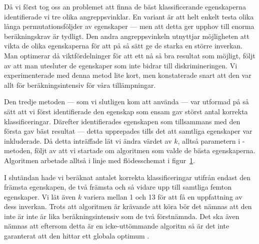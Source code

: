 \documentclass[../rapport_MVEX01-11-05]{subfiles}
\begin{document}
Då vi först tog oss an problemet att finna de bäst klassificerande
egenskaperna identifierade vi tre olika angreppsvinklar. En variant är att helt
enkelt testa olika långa permutationsföljder av egenskaper ---
men att detta ger upphov till enorma beräkningskrav är tydligt. 
Den andra angreppsvinkeln utnyttjar
möjligheten att vikta de olika egenskaperna för att på så sätt ge de starka en
större inverkan. Man optimerar då
viktfördelninger för att ett nå så bra resultat som möjligt, följt av att man
utesluter de egenskaper som inte bidrar till diskrimineringen. Vi experimenterade
med denna metod lite kort, men konstaterade snart att den var allt för 
beräkningsintensiv för våra tillämpningar.

Den tredje metoden --- som vi slutligen kom att
använda --- var utformad på så sätt att vi först identifierade den egenskap som
ensam gav störst antal korrekta klassificeringar. Därefter identifierades
egenskapen som tillsammans med den första gav bäst resultat --- detta
upprepades tills det att samtliga egenskaper var inkluderade. Då detta
inträffade lät vi ändra värdet av $k$, alltså parametern i \knn-metoden, följt av
att vi startade om algoritmen som valde de bästa egenskaperna. Algoritmen
arbetade alltså i linje med flödesschemat i figur~\ref{fig:knn-flowchart}. 
\begin{figure}[tbp]
	\centering 
	\caption{}
	\label{fig:knn-flowchart}
\end{figure}

I slutändan hade vi beräknat antalet korrekta klassificeringar utifrån
endast den främsta egenskapen, de två främsta och så vidare upp till
samtliga femton egenskaper. Vi lät även $k$ variera mellan 1 och 13 för att få
en uppfattning av dess inverkan. Trots att algoritmen är krävande att köra bör
det nämnas att den inte är inte är lika beräkningsintensiv som de två
förstnämnda. Det ska även nämnas att eftersom detta är en icke-uttömmande
algoritm så är det inte garanterat att den hittar ett globala optimum \cite{Cover77}.
\end{document}
